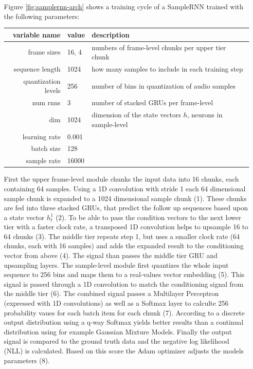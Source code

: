 \documentclass[12pt]{article}
\begin{document}
Figure \ref{fig:samplernn-arch} shows a training cycle of a SampleRNN trained with the following parameters:
\begin{center}
\begin{tabular}{ r | l | l }
variable name & value & description \\
\hline
frame sizes & 16, 4 & numbers of frame-level chunks per upper tier chunk\\
sequence length & 1024 & how many samples to include in each training step\\
quantization levels & 256 & number of bins in quantization of audio samples\\
num rnns & 3 & number of stacked GRUs per frame-level \\
dim & 1024 & dimension of the state vectors $h$, neurons in sample-level \\
learning rate & 0.001 & \\
batch size & 128 & \\
sample rate & 16000 & \\
\end{tabular}
\end{center}

First the upper frame-level module chunks the input data into 16 chunks, each containing 64 samples. 
Using a 1D convolution with stride 1 each 64 dimensional sample chunk is expanded to a 1024 dimensional sample chunk (1).
These chunks are fed into three stacked GRUs, that predict the follow up sequences based upon a state vector $h^1_t$ (2).
To be able to pass the condition vectors to the next lower tier with a faster clock rate, a transposed 1D convolution helps to upsample 16 to 64 chunks (3).
The middle tier repeats step 1, but uses a smaller clock rate (64 chunks, each with 16 samples) and adds the expanded result to the conditioning vector from above (4).
The signal than passes the middle tier GRU and upsampling layers.
The sample-level module first quantizes the whole input sequence to 256 bins and maps them to a real-values vector embedding (5).
This signal is passed through a 1D convolution to match the conditioning signal from the middle tier (6).
The combined signal passes a Multilayer Perceptron (expressed with 1D convolutions) as well as a Softmax layer to calculte 256 probability vaues for each batch item for each chunk (7).
According to \cite{mehri2016samplernn} a discrete output distribution using a q-way Softmax yields better results than a continual distribution using for example Gaussian Mixture Models.
Finally the output signal is compared to the ground truth data and the negative log likelihood (NLL) is calculated.
Based on this score the Adam optimizer adjusts the models parameters (8). 
\end{document}
